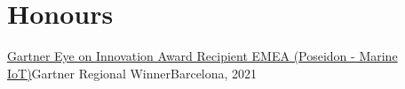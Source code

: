 \section{Honours}
  \resumeSubHeadingListStart
    \resumeSubheading
      {\href{https://www.gartner.com/en/about/awards/eye-on-innovation}{Gartner Eye on Innovation Award Recipient EMEA (Poseidon - Marine IoT)}}{Gartner}
      {Regional Winner}{Barcelona, 2021}
      

  \resumeSubHeadingListEnd